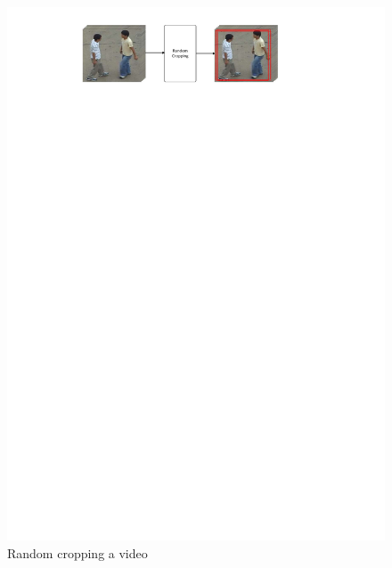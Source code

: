 \begin{figure}
	\includegraphics[trim=2cm 25.5cm 0cm 1cm]{fig01/cropping.pdf}
	\caption{Random cropping a video}
	\label{fig:cropping_4}
\end{figure}  
   

